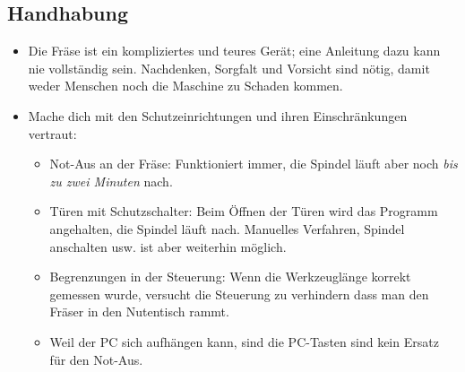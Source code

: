 \documentclass{\basedir/fablab-document}
\begin{document}
\subsection{Handhabung}
\begin{itemize}
 \item Die Fräse ist ein kompliziertes und teures Gerät; eine Anleitung dazu kann nie vollständig sein. Nachdenken, Sorgfalt und Vorsicht sind nötig, damit weder Menschen noch die Maschine zu Schaden kommen.
 \item Mache dich mit den Schutzeinrichtungen und ihren Einschränkungen vertraut:
\begin{itemize}
 \item Not-Aus an der Fräse: Funktioniert immer, die Spindel läuft aber noch \emph{bis zu zwei Minuten} nach.
 \item Türen mit Schutzschalter: Beim Öffnen der Türen wird das Programm angehalten, die Spindel läuft nach. Manuelles Verfahren, Spindel anschalten usw. ist aber weiterhin möglich.
 \item Begrenzungen in der Steuerung: Wenn die Werkzeuglänge korrekt gemessen wurde, versucht die Steuerung zu verhindern dass man den Fräser in den Nutentisch rammt.
 \item Weil der PC sich aufhängen kann, sind die PC-Tasten sind kein Ersatz für den Not-Aus.
\end{itemize}


\end{itemize}
\end{document}
